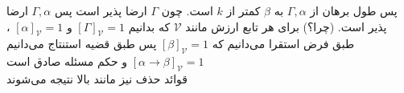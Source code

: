 \begin {ans}
\begin {enumerate}
		پس طول برهان از 
		$\Gamma , \alpha$
		به
		$\beta$ 
		کمتر از $k$ است.
		چون $\Gamma$ ارضا پذیر است پس 
		$\Gamma , \alpha$ 
		ارضا پذیر است. (چرا؟)
		 برای هر تابع ارزش مانند
		  $\mathcal {V}$ 
		  که بدانیم
		$[\Gamma]_\mathcal{V} = 1$ و $[\alpha]_\mathcal{V} = 1$ 
		، طبق فرض استقرا می‌دانیم که
		$[\beta]_\mathcal{V} = 1$
		پس طبق قضیه استنتاج می‌دانیم
		$[\alpha \to \beta]_\mathcal{V} = 1$
		و حکم مسئله صادق است \\
		قوائد حذف نیز مانند بالا نتیجه می‌شوند
		
		
		\end {enumerate}
				
	\end {ans}
	
